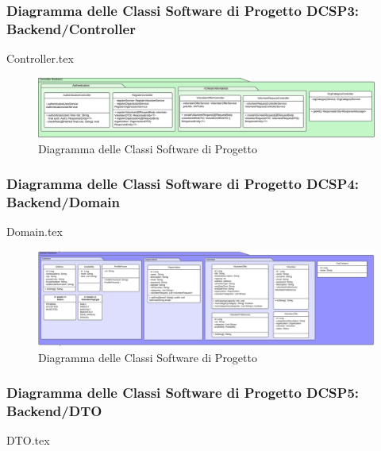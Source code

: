 \documentclass[12pt]{article}
\begin{document}
\subsubsection{Diagramma delle Classi Software di Progetto DCSP3: Backend/Controller}
{Controller.tex}

\begin{figure}[H]
    \includegraphics[width=\textwidth, height=\textheight,keepaspectratio]{Immagini/DCSP/Iterazione 1/Backend/DCSPController.png}
        \caption{Diagramma delle Classi Software di Progetto}
        \label{fig:diagrammaDCSP3}
\end{figure}

\subsubsection{Diagramma delle Classi Software di Progetto DCSP4: Backend/Domain}
{Domain.tex}

\begin{figure}[H]
    \includegraphics[width=\textwidth, height=\textheight,keepaspectratio]{Immagini/DCSP/Iterazione 1/Backend/DCSPDomain.png}
        \caption{Diagramma delle Classi Software di Progetto}
        \label{fig:diagrammaDCSP4}
\end{figure}

\subsubsection{Diagramma delle Classi Software di Progetto DCSP5: Backend/DTO}
{DTO.tex}
\end{document}
